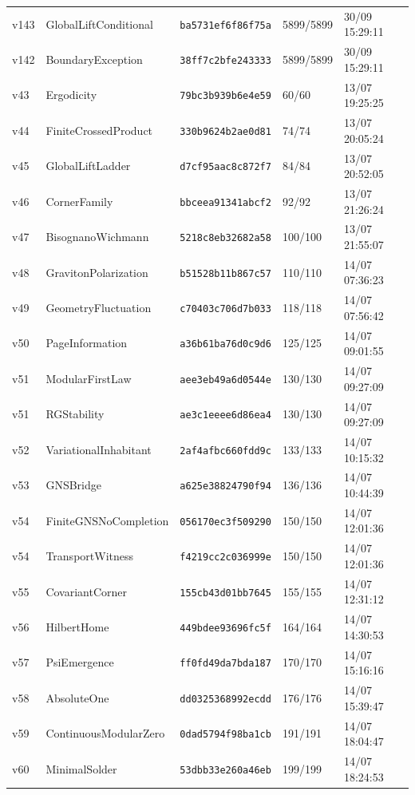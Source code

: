 \documentclass[11pt]{article}
\theoremstyle{definition}\newtheorem{deriv}{Derivação}
\begin{document}
{\begin{longtable}{@{}lllll@{}}
v143 & GlobalLiftConditional & \texttt{ba5731ef6f86f75a} & 5899/5899 & 30/09 15:29:11 \\
v142 & BoundaryException & \texttt{38ff7c2bfe243333} & 5899/5899 & 30/09 15:29:11 \\
v43 & Ergodicity & \texttt{79bc3b939b6e4e59} & 60/60 & 13/07 19:25:25 \\
v44 & FiniteCrossedProduct & \texttt{330b9624b2ae0d81} & 74/74 & 13/07 20:05:24 \\
v45 & GlobalLiftLadder & \texttt{d7cf95aac8c872f7} & 84/84 & 13/07 20:52:05 \\
v46 & CornerFamily & \texttt{bbceea91341abcf2} & 92/92 & 13/07 21:26:24 \\
v47 & BisognanoWichmann & \texttt{5218c8eb32682a58} & 100/100 & 13/07 21:55:07 \\
v48 & GravitonPolarization & \texttt{b51528b11b867c57} & 110/110 & 14/07 07:36:23 \\
v49 & GeometryFluctuation & \texttt{c70403c706d7b033} & 118/118 & 14/07 07:56:42 \\
v50 & PageInformation & \texttt{a36b61ba76d0c9d6} & 125/125 & 14/07 09:01:55 \\
v51 & ModularFirstLaw & \texttt{aee3eb49a6d0544e} & 130/130 & 14/07 09:27:09 \\
v51 & RGStability & \texttt{ae3c1eeee6d86ea4} & 130/130 & 14/07 09:27:09 \\
v52 & VariationalInhabitant & \texttt{2af4afbc660fdd9c} & 133/133 & 14/07 10:15:32 \\
v53 & GNSBridge & \texttt{a625e38824790f94} & 136/136 & 14/07 10:44:39 \\
v54 & FiniteGNSNoCompletion & \texttt{056170ec3f509290} & 150/150 & 14/07 12:01:36 \\
v54 & TransportWitness & \texttt{f4219cc2c036999e} & 150/150 & 14/07 12:01:36 \\
v55 & CovariantCorner & \texttt{155cb43d01bb7645} & 155/155 & 14/07 12:31:12 \\
v56 & HilbertHome & \texttt{449bdee93696fc5f} & 164/164 & 14/07 14:30:53 \\
v57 & PsiEmergence & \texttt{ff0fd49da7bda187} & 170/170 & 14/07 15:16:16 \\
v58 & AbsoluteOne & \texttt{dd0325368992ecdd} & 176/176 & 14/07 15:39:47 \\
v59 & ContinuousModularZero & \texttt{0dad5794f98ba1cb} & 191/191 & 14/07 18:04:47 \\
v60 & MinimalSolder & \texttt{53dbb33e260a46eb} & 199/199 & 14/07 18:24:53 \\

\end{longtable}}
\end{document}
